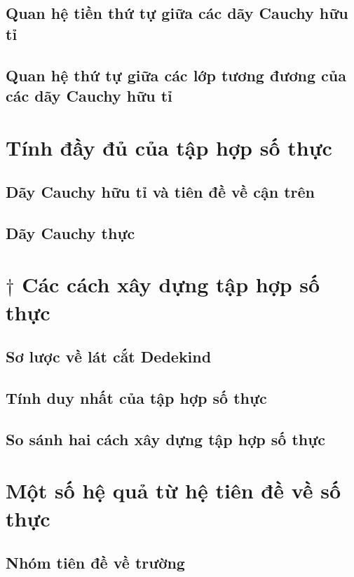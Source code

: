 \subsection{Quan hệ tiền thứ tự giữa các dãy Cauchy hữu tỉ}

\subsection{Quan hệ thứ tự giữa các lớp tương đương của các dãy Cauchy hữu tỉ}

\section{Tính đầy đủ của tập hợp số thực}

\subsection{Dãy Cauchy hữu tỉ và tiên đề về cận trên}

\subsection{Dãy Cauchy thực}

\section{$\dagger$ Các cách xây dựng tập hợp số thực}

\subsection{Sơ lược về lát cắt Dedekind}

\subsection{Tính duy nhất của tập hợp số thực}

\subsection{So sánh hai cách xây dựng tập hợp số thực}

\section{Một số hệ quả từ hệ tiên đề về số thực}

\subsection{Nhóm tiên đề về trường}

